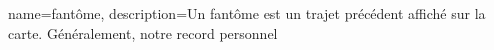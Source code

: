 % 

{
    name=fantôme,
    description={Un fantôme est un trajet précédent affiché sur la carte. Généralement, notre record personnel}
}

